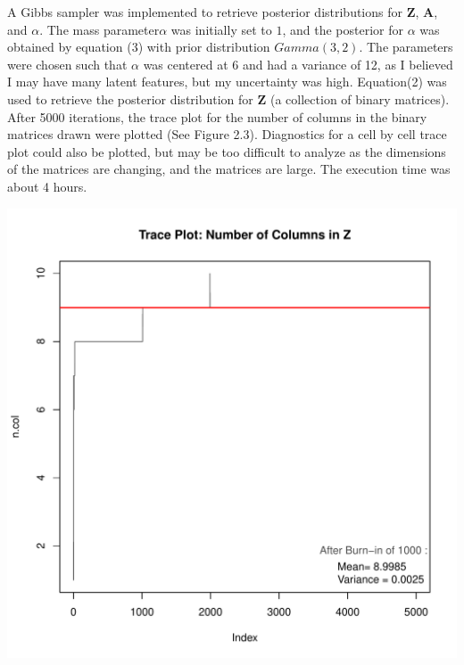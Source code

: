\noindent
A Gibbs sampler was implemented to retrieve posterior distributions for $\bm
Z$, $\bm A$, and $\alpha$. The mass parameter$\alpha$ was initially set to $1$,
and the posterior for $\alpha$ was obtained by equation (3) with prior
distribution $Gamma(3,2)$.  The parameters were chosen such that $\alpha$ was
centered at 6 and had a variance of 12, as I believed I may have many latent
features, but my uncertainty was high.  Equation(2) was used to retrieve the
posterior distribution for $\bm Z$ (a collection of binary matrices). After
5000 iterations, the trace plot for the number of columns in the binary
matrices drawn were plotted (See Figure 2.3). Diagnostics for a cell by cell
trace plot could also be plotted, but may be too difficult to analyze as the
dimensions of the matrices are changing, and the matrices are large. The
execution time was about 4 hours.
\beginmyfig
  \caption{}
  \includegraphics{images/traceplot.pdf}
  \vspace{-15mm}
\endmyfig
\beginmyfig
  \caption{}
